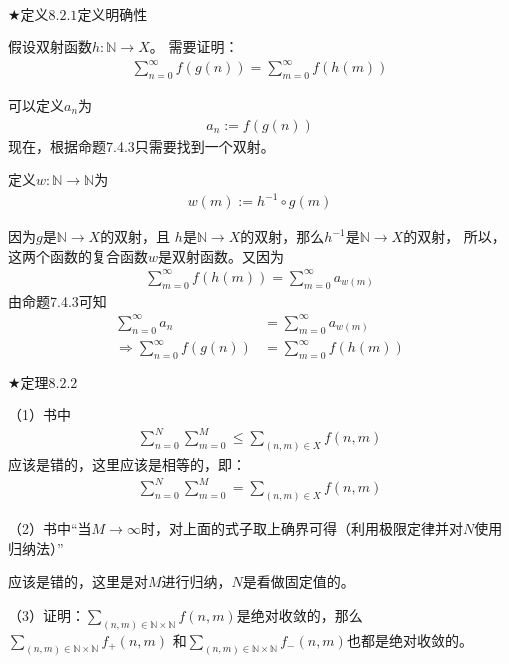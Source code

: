 \documentclass{article}
\begin{document}
$\bigstar \textbf{定义}8.2.1 \textbf{定义明确性}$

假设双射函数$h: \mathbb{N} \rightarrow X$。
需要证明：
\begin{align*}
    \sum \limits_{n=0}^\infty f(g(n)) = \sum \limits_{m=0}^\infty f(h(m))
\end{align*}

可以定义$a_n$为
\begin{align*}
    a_n := f(g(n))
\end{align*}
现在，根据命题7.4.3只需要找到一个双射。

定义$w: \mathbb{N} \rightarrow \mathbb{N}$为
\begin{align*}
    w(m) := h^{-1} \circ g(m)
\end{align*}

因为$g$是$\mathbb{N} \rightarrow X$的双射，且
$h$是$\mathbb{N} \rightarrow X$的双射，那么$h^{-1}$是$\mathbb{N} \rightarrow X$的双射，
所以，这两个函数的复合函数$w$是双射函数。又因为
\begin{align*}
    \sum \limits_{m=0}^\infty f(h(m)) = \sum \limits_{m=0}^\infty a_{w(m)}
\end{align*}
由命题7.4.3可知
\begin{align*}
    \sum \limits_{n=0}^\infty a_n                 & = \sum \limits_{m=0}^\infty a_{w(m)} \\
    \Rightarrow \sum \limits_{n=0}^\infty f(g(n)) & = \sum \limits_{m=0}^\infty f(h(m))
\end{align*}


$\bigstar \textbf{定理}8.2.2$

（1）书中
\begin{align*}
    \sum \limits_{n=0}^N \sum \limits_{m=0}^M \leq \sum \limits_{(n,m) \in X}f(n,m)
\end{align*}
应该是错的，这里应该是相等的，即：
\begin{align*}
    \sum \limits_{n=0}^N \sum \limits_{m=0}^M = \sum \limits_{(n,m) \in X}f(n,m)
\end{align*}

（2）书中“当$M \rightarrow \infty$时，对上面的式子取上确界可得（利用极限定律并对$N$使用归纳法）”

应该是错的，这里是对$M$进行归纳，$N$是看做固定值的。

（3）证明：$\sum \limits_{(n,m) \in \mathbb{N} \times \mathbb{N}}f(n,m)$是绝对收敛的，那么
$\sum \limits_{(n,m) \in \mathbb{N} \times \mathbb{N}}f_{+}(n,m)$
和$\sum \limits_{(n,m) \in \mathbb{N} \times \mathbb{N}}f_{-}(n,m)$也都是绝对收敛的。
\end{document}
